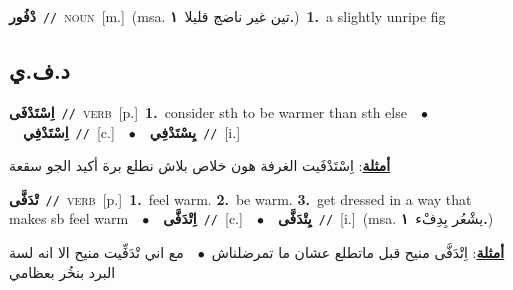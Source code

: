 \documentclass[10pt,a4paper,twoside]{article} %
\begin{document}
\begin{multicols}{2}
{\setlength\topsep{0pt}\textbf{\foreignlanguage{arabic}{دْفُور}}\ {\color{gray}\texttt{//}\color{black}}\ \textsc{noun}\ [m.]\ \color{gray}(msa. \foreignlanguage{arabic}{تين غير ناضج قليلا}~\foreignlanguage{arabic}{\textbf{١.}})\color{black}\ \textbf{1.}~a slightly unripe fig\ } \vspace{2mm}

\vspace{-3mm}
\subsection*{\color{blue}\foreignlanguage{arabic}{د.ف.ي}\color{blue}{}} 

{\setlength\topsep{0pt}\textbf{\foreignlanguage{arabic}{اِسْتَدْفَى}}\ {\color{gray}\texttt{//}\color{black}}\ \textsc{verb}\ [p.]\ \textbf{1.}~consider sth to be warmer than sth else\ \ $\bullet$\ \ \setlength\topsep{0pt}\textbf{\foreignlanguage{arabic}{اِسْتَدْفِي}}\ {\color{gray}\texttt{//}\color{black}}\ [c.]\ \ $\bullet$\ \ \setlength\topsep{0pt}\textbf{\foreignlanguage{arabic}{يِسْتَدْفِي}}\ {\color{gray}\texttt{//}\color{black}}\ [i.]\  \begin{flushright}\color{gray}\foreignlanguage{arabic}{\textbf{\underline{\foreignlanguage{arabic}{أمثلة}}}: اِسْتَدْفَيت الغرفة هون خلاص بلاش نطلع برة أكيد الجو سقعة}\end{flushright}\color{black}} \vspace{2mm}

{\setlength\topsep{0pt}\textbf{\foreignlanguage{arabic}{تْدَفَّى}}\ {\color{gray}\texttt{//}\color{black}}\ \textsc{verb}\ [p.]\ \textbf{1.}~feel warm.  \textbf{2.}~be warm.  \textbf{3.}~get dressed in a way that makes sb feel warm\ \ $\bullet$\ \ \setlength\topsep{0pt}\textbf{\foreignlanguage{arabic}{اِتْدَفَّى}}\ {\color{gray}\texttt{//}\color{black}}\ [c.]\ \ $\bullet$\ \ \setlength\topsep{0pt}\textbf{\foreignlanguage{arabic}{يِتْدَفَّى}}\ {\color{gray}\texttt{//}\color{black}}\ [i.]\ \color{gray}(msa. \foreignlanguage{arabic}{يشْعُر بِدِفْء}~\foreignlanguage{arabic}{\textbf{١.}})\color{black}\  \begin{flushright}\color{gray}\foreignlanguage{arabic}{\textbf{\underline{\foreignlanguage{arabic}{أمثلة}}}: اِتْدَفَّى منيح قبل ماتطلع عشان ما تمرضلناش\ $\bullet$\ \  مع اني تْدَفِّيت منيح الا انه لسة البرد بنخُر بعظامي}\end{flushright}\color{black}} \vspace{2mm}


\end{multicols}
\end{document}
